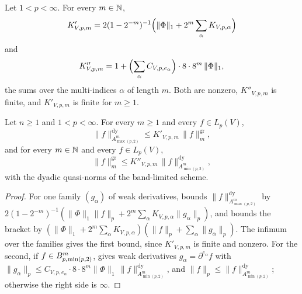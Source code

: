 \begin{definition}
\label{def:sobolev-grid-consts}
\leanok
{}
Let $1 < p < \infty$. For every $m \in \mathbb{N}$,
\[
  K'_{V,p,m} = 2 (1 - 2^{-m})^{-1} \Bigl( \|\Phi\|_1 + 2^m \sum_\alpha K_{V,p,\alpha} \Bigr)
\]
and
\[
  K''_{V,p,m} = 1 + \Bigl( \sum_\alpha C_{V,p,e_\alpha} \Bigr) \cdot 8 \cdot 8^m \, \|\Phi\|_1 ,
\]
the sums over the multi-indices $\alpha$ of length $m$. Both are nonzero, $K''_{V,p,m}$ is
finite, and $K'_{V,p,m}$ is finite for $m \geq 1$.
\end{definition}

\begin{theorem}
\label{thm:sobolev-grid-norm-sandwich}
\leanok
{}
Let $n \geq 1$ and $1 < p < \infty$. For every $m \geq 1$ and every $f \in L_p(V)$,
\[
  \|f\|^{\mathrm{dy}}_{A^m_{\max(p,2)}} \leq K'_{V,p,m} \, \|f\|^{\mathrm{gr}}_{m} ,
\]
and for every $m \in \mathbb{N}$ and every $f \in L_p(V)$,
\[
  \|f\|^{\mathrm{gr}}_{m} \leq K''_{V,p,m} \, \|f\|^{\mathrm{dy}}_{A^m_{\min(p,2)}} ,
\]
with the dyadic quasi-norms of the band-limited scheme.
\end{theorem}

\begin{proof}
\leanok
For one family $(g_\alpha)$ of weak derivatives,  bounds
$\|f\|^{\mathrm{dy}}_{A^m_{\max(p,2)}}$ by
$2 (1 - 2^{-m})^{-1} (\|\Phi\|_1 \|f\|_p + 2^m \sum_\alpha K_{V,p,\alpha} \|g_\alpha\|_p)$, and
 bounds the bracket by
$(\|\Phi\|_1 + 2^m \sum_\alpha K_{V,p,\alpha})(\|f\|_p + \sum_\alpha \|g_\alpha\|_p)$. The
infimum over the families gives the first bound, since $K'_{V,p,m}$ is finite and nonzero. For
the second, if $f \in B^{m}_{p,\min(p,2)}$,  gives weak
derivatives $g_\alpha = \partial^{e_\alpha} f$ with
$\|g_\alpha\|_p \leq C_{V,p,e_\alpha} \cdot 8 \cdot 8^m \|\Phi\|_1 \,
\|f\|^{\mathrm{dy}}_{A^m_{\min(p,2)}}$,
and $\|f\|_p \leq \|f\|^{\mathrm{dy}}_{A^m_{\min(p,2)}}$; otherwise the right side is $\infty$.
\end{proof}

